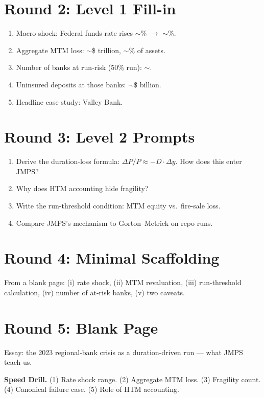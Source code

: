 \documentclass[11pt]{article}
\newcommand{\blank}[1]{\underline{\hspace{#1}}}
\begin{document}
\section*{Round 2: Level 1 Fill-in}
\begin{enumerate}
\item Macro shock: Federal funds rate rises $\sim$\blank{1cm}\% $\to$ $\sim$\blank{1cm}\%.
\item Aggregate MTM loss: $\sim$\$\blank{1cm} trillion, $\sim$\blank{1cm}\% of assets.
\item Number of banks at run-risk (50\% run): $\sim$\blank{1cm}.
\item Uninsured deposits at those banks: $\sim$\$\blank{1cm} billion.
\item Headline case study: \blank{2cm} Valley Bank.
\end{enumerate}

\section*{Round 3: Level 2 Prompts}
\begin{enumerate}
\item Derive the duration-loss formula: $\Delta P/P \approx -D\cdot\Delta y$. How does this enter JMPS?
\item Why does HTM accounting hide fragility?
\item Write the run-threshold condition: MTM equity vs.\ fire-sale loss.
\item Compare JMPS's mechanism to Gorton--Metrick on repo runs.
\end{enumerate}

\section*{Round 4: Minimal Scaffolding}
From a blank page: (i) rate shock, (ii) MTM revaluation, (iii) run-threshold calculation, (iv) number of at-risk banks, (v) two caveats.

\section*{Round 5: Blank Page}
Essay: the 2023 regional-bank crisis as a duration-driven run --- what JMPS teach us.

\vspace{6pt}
\begin{drillbox}
\textbf{Speed Drill.} (1) Rate shock range. (2) Aggregate MTM loss. (3) Fragility count. (4) Canonical failure case. (5) Role of HTM accounting.
\end{drillbox}
\end{document}
